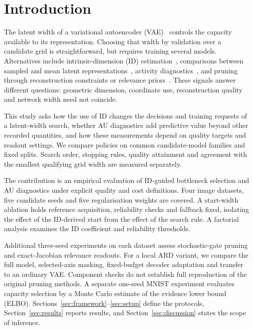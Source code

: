 \section{Introduction}\label{sec:intro}

The latent width of a variational autoencoder (VAE)~\cite{kingma2014vae}
controls the capacity available to its representation. Choosing that width
by validation over a candidate grid is straightforward, but requires
training several models. Alternatives include intrinsic-dimension (ID)
estimation~\cite{facco2017twonn,levina2005mle}, comparisons between sampled
and mean latent representations~\cite{bonheme2022fondue}, activity
diagnostics~\cite{burda2016iwae,bonheme2023active}, and pruning through
reconstruction constraints or relevance priors~\cite{deboom2020geco,saha2025ardvae}.
These signals answer different questions: geometric dimension, coordinate
use, reconstruction quality and network width need not coincide.

This study asks how the use of ID changes the decisions and training
requests of a latent-width search, whether AU diagnostics add predictive
value beyond other recorded quantities, and how these measurements depend
on quality targets and readout settings. We compare policies on common
candidate-model families and fixed splits. Search order, stopping rules,
quality attainment and agreement with the smallest qualifying grid width
are measured separately.

The contribution is an empirical evaluation of ID-guided bottleneck
selection and AU diagnostics under explicit quality and cost definitions.
Four image datasets, five candidate seeds and five regularisation weights
are covered. A start-width ablation holds reference acquisition,
reliability checks and fallback fixed, isolating the effect of the
ID-derived start from the effect of the search rule. A factorial analysis
examines the ID coefficient and reliability thresholds.

Additional three-seed experiments on each dataset assess stochastic-gate
pruning and exact-Jacobian relevance readouts. For a local ARD variant,
we compare the full model, selected-axis masking, fixed-budget decoder
adaptation and transfer to an ordinary VAE. Component checks do not
establish full reproduction of the original pruning methods. A separate
one-seed MNIST experiment evaluates capacity selection by a Monte Carlo
estimate of the evidence lower bound (ELBO).
Sections~\ref{sec:framework}--\ref{sec:setup} define the protocols,
Section~\ref{sec:results} reports results, and
Section~\ref{sec:discussion} states the scope of inference.


